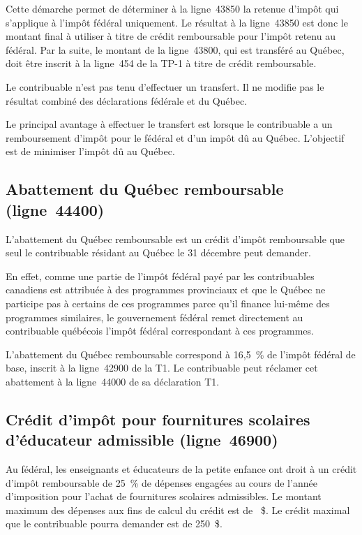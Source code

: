 Cette démarche permet de déterminer à la ligne~43850 la retenue d'impôt qui s'applique à l'impôt fédéral uniquement. Le résultat à la ligne~43850 est donc le montant final à utiliser à titre de crédit remboursable pour l'impôt retenu au fédéral. Par la suite, le montant de la ligne~43800, qui est transféré au Québec, doit être inscrit à la ligne~454 de la TP-1 à titre de crédit remboursable.

\begin{note}
	Le contribuable n'est pas tenu d'effectuer un transfert. Il ne modifie pas le résultat combiné des déclarations fédérale et du Québec.
	
	Le principal avantage à effectuer le transfert est lorsque le contribuable a un remboursement d'impôt pour le fédéral et d'un impôt dû au Québec. L'objectif est de minimiser l'impôt dû au Québec.
\end{note}


\subsection{Abattement du Québec remboursable (ligne~44400)}
L'abattement du Québec remboursable est un crédit d'impôt remboursable que seul le contribuable résidant au Québec le 31 décembre peut demander. 

En effet, comme une partie de l'impôt fédéral payé par les contribuables canadiens est attribuée à des programmes provinciaux et que le Québec ne participe pas à certains de ces programmes parce qu'il finance lui-même des programmes similaires, le gouvernement fédéral remet directement au contribuable québécois l'impôt fédéral correspondant à ces programmes.

L'abattement du Québec remboursable correspond à 16,5~\% de l'impôt fédéral de base, inscrit à la ligne~42900 de la T1. Le contribuable peut réclamer cet abattement à la ligne~44000 de sa déclaration T1.


\subsection{Crédit d'impôt pour fournitures scolaires d'éducateur admissible (ligne~46900)}
Au fédéral, les enseignants et éducateurs de la petite enfance ont droit à un crédit d'impôt remboursable de 25~\% de dépenses engagées au cours de l'année d'imposition pour l'achat de fournitures scolaires admissibles. Le montant maximum des dépenses aux fins de calcul du crédit est de ~\$. Le crédit maximal que le contribuable pourra demander est de 250~\$.


